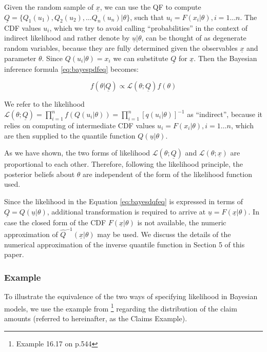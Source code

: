 \documentclass[
  12pt,
]{article}
\begin{document}
Given the random sample of \(\underline x\), we can use the QF to compute \(\underline{Q}=\{Q_1(u_1), Q_2(u_2), \dots Q_n(u_n)|\theta\}\), such that \(u_i=F(x_i|\theta), i=1\dots n\). The CDF values \(u_i\), which we try to avoid calling ``probabilities'' in the context of indirect likelihood and rather denote by \(\underline u|\theta\), can be thought of as degenerate random variables, because they are fully determined given the observables \(\underline{x}\) and parameter \(\theta\). Since \(Q(u_i|\theta)=x_i\) we can substitute \(\underline Q\) for \(\underline x\). Then the Bayesian inference formula \eqref{eq:bayespdfeq} becomes:

\[
f(\theta|\underline{Q}) \propto \mathcal{L}(\theta;\underline{Q})f(\theta)
\label{eq:bayesdqfeq}
\]

We refer to the likelihood \(\mathcal{L}(\theta;\underline{Q})=\prod_{i=1}^{n} f(Q(u_i|\theta))=\prod_{i=1}^n[q(u_i|\theta)]^{-1}\) as ``indirect'', because it relies on computing of intermediate CDF values \(u_i=F(x_i|\theta), i=1\dots n\), which are then supplied to the quantile function \(Q(\underline u|\theta)\).

As we have shown, the two forms of likelihood \(\mathcal{L}(\theta;\underline{Q})\) and \(\mathcal{L}(\theta;\underline{x})\) are proportional to each other. Therefore, following the likelihood principle, the posterior beliefs about \(\theta\) are independent of the form of the likelihood function used.

Since the likelihood in the Equation \eqref{eq:bayesdqfeq} is expressed in terms of \(\underline {Q}=Q(\underline{u}|\theta)\), additional transformation is required to arrive at \(\underline{u}=F(\underline{x}|\theta)\). In case the closed form of the CDF \(F(\underline x|\theta)\) is not available, the numeric approximation of \(\widehat{Q}^{-1}(\underline{x}|\theta)\) may be used. We discuss the details of the numerical approximation of the inverse quantile function in Section 5 of this paper.

\hypertarget{example}{%
\subsubsection{Example}\label{example}}

To illustrate the equivalence of the two ways of specifying likelihood in Bayesian models, we use the example from \citet{klugman2004LossModelsData}\footnote{Example 16.17 on p.544} regarding the distribution of the claim amounts (referred to hereinafter, as the Claims Example).
\end{document}

